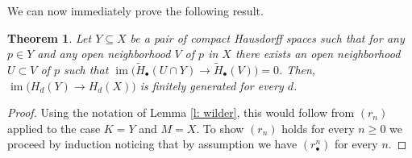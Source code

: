 \documentclass{amsart}
\newtheorem{theorem}{Theorem}
\theoremstyle{definition}
\DeclareMathOperator{\im}{im}
\begin{document}
	We can now immediately prove the following result.
	
	\begin{theorem}
		Let $Y \subseteq X$ be a pair of compact Hausdorff spaces such that for any $p \in Y$ and any open neighborhood $V$ of $p$ in $X$ there exists an open neighborhood $U \subset V$ of $p$ such that $\im \big(\widetilde H_\bullet(U \cap Y) \to \widetilde H_\bullet(V)\big) = 0$. Then, $\im \big(H_d(Y) \to H_d(X)\big)$ is finitely generated for every $d$.
	\end{theorem}

	\begin{proof}
		Using the notation of Lemma \ref{l: wilder}, this would follow from $(r_n)$ applied to the case $K = Y$ and $M = X$. To show $(r_n)$ holds for every $n \geq 0$ we proceed by induction noticing that by assumption we have $(r^n_\bullet)$ for every $n$. 
	\end{proof}
\end{document}
